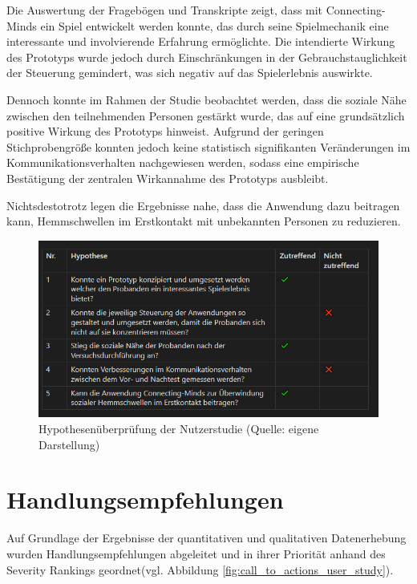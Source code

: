 Die Auswertung der Fragebögen und Transkripte zeigt, dass mit Connecting-Minds ein Spiel entwickelt werden konnte, das durch seine Spielmechanik eine interessante und involvierende Erfahrung ermöglichte. Die intendierte Wirkung des Prototyps wurde jedoch durch Einschränkungen in der Gebrauchstauglichkeit der Steuerung gemindert, was sich negativ auf das Spielerlebnis auswirkte.

Dennoch konnte im Rahmen der Studie beobachtet werden, dass die soziale Nähe zwischen den teilnehmenden Personen gestärkt wurde, das auf eine grundsätzlich positive Wirkung des Prototyps hinweist. Aufgrund der geringen Stichprobengröße konnten jedoch keine statistisch signifikanten Veränderungen im Kommunikationsverhalten nachgewiesen werden, sodass eine empirische Bestätigung der zentralen Wirkannahme des Prototyps ausbleibt.

Nichtsdestotrotz legen die Ergebnisse nahe, dass die Anwendung dazu beitragen kann, Hemmschwellen im Erstkontakt mit unbekannten Personen zu reduzieren.

\begin{figure}[ht]
\centering
\includegraphics[width=1\linewidth]{content/pictures/Hypothesen_Nutzerstudie.PNG}
\caption{Hypothesenüberprüfung der Nutzerstudie (Quelle: eigene Darstellung)}
\label{fig:hypothesis_user_study}
\end{figure}

\section{Handlungsempfehlungen}

Auf Grundlage der Ergebnisse der quantitativen und qualitativen Datenerhebung wurden Handlungsempfehlungen abgeleitet und in ihrer Priorität anhand des Severity Rankings geordnet(vgl. Abbildung \ref{fig:call_to_actions_user_study}).

